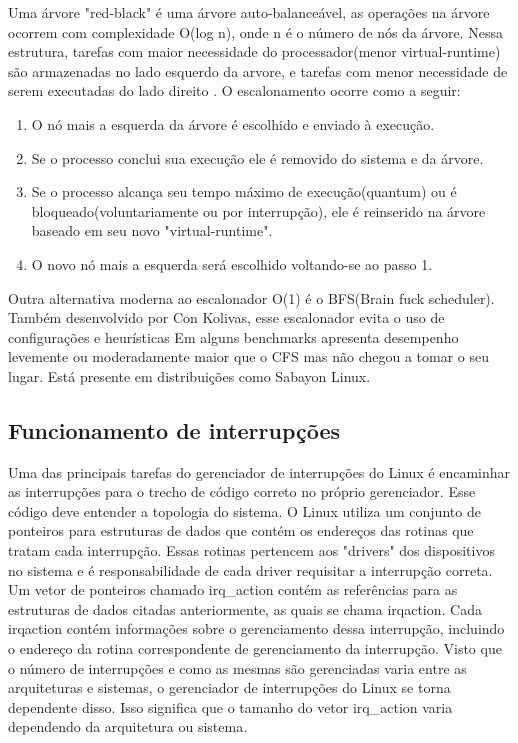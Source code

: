 \documentclass[conference]{IEEEtran}
\begin{document}
Uma árvore "red-black" é uma árvore auto-balanceável, as operações na árvore ocorrem com complexidade O(log n), onde n é o número de nós da árvore. Nessa estrutura, tarefas com maior necessidade do processador(menor virtual-runtime) são armazenadas no lado esquerdo da arvore, e tarefas com menor necessidade de serem executadas do lado direito \cite{LinuxSchedulerIBM}. O escalonamento ocorre como a seguir:
\begin{enumerate}
	\item O nó mais a esquerda da árvore é escolhido e enviado à execução.
	\item Se o processo conclui sua execução ele é removido do sistema e da árvore.
	\item Se o processo alcança seu tempo máximo de execução(quantum) ou é bloqueado(voluntariamente ou por interrupção), ele é reinserido na árvore baseado em seu novo "virtual-runtime".
	\item O novo nó mais a esquerda será escolhido voltando-se ao passo 1.\cite{LinuxSchedulerWiki}
\end{enumerate}

Outra alternativa moderna ao escalonador O(1) é o BFS(Brain fuck scheduler).\cite{LinuxSchedulerWiki} Também desenvolvido por Con Kolivas, esse escalonador evita o uso de configurações e heurísticas Em alguns benchmarks apresenta desempenho levemente ou moderadamente maior que o CFS mas não chegou a tomar o seu lugar. Está presente em distribuições como Sabayon Linux\cite{LinuxSchedulerBFS}.
\subsection{Funcionamento de interrupções}\label{sec:LinuxInt}
Uma das principais tarefas do gerenciador de interrupções do Linux é encaminhar as interrupções para o trecho de código correto no próprio gerenciador. Esse código deve entender a topologia do sistema. O Linux utiliza um conjunto de ponteiros para estruturas de dados que contém os endereços das rotinas que tratam cada interrupção. Essas rotinas pertencem aos "drivers" dos dispositivos no sistema e é responsabilidade de cada driver requisitar a interrupção correta. Um vetor de ponteiros chamado irq\_action contém as referências para as estruturas de dados citadas anteriormente, as quais se chama irqaction. Cada irqaction contém informações sobre o gerenciamento dessa interrupção, incluindo o endereço da rotina correspondente de gerenciamento da interrupção. Visto que o número de interrupções e como as mesmas são gerenciadas varia entre as arquiteturas e sistemas, o gerenciador de interrupções do Linux se torna dependente disso. Isso significa que o tamanho do vetor irq\_action varia dependendo da arquitetura ou sistema.\\
\end{document}
